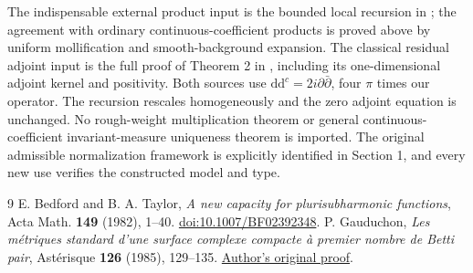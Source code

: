 \documentclass[11pt]{article}
\newcommand{\ddc}{\mathrm{d}\mathrm{d}^c}
\begin{document}
The indispensable external product input is the bounded local recursion in
\cite{BT}; the agreement with ordinary continuous-coefficient products is
proved above by uniform mollification and smooth-background expansion.
The classical residual adjoint input is the full proof of Theorem 2 in
\cite{Gau}, including its one-dimensional adjoint kernel and positivity.
Both sources use $\ddc=2i\partial\bar\partial$, four $\pi$ times our
operator. The recursion rescales homogeneously and the zero adjoint equation
is unchanged. No rough-weight multiplication theorem or general
continuous-coefficient invariant-measure uniqueness theorem is imported.
The original admissible normalization framework is explicitly identified
in Section 1, and every new use verifies the constructed model and type.

\begin{thebibliography}{9}
 E. Bedford and B. A. Taylor,
\emph{A new capacity for plurisubharmonic functions},
Acta Math. \textbf{149} (1982), 1--40.
\href{https://doi.org/10.1007/BF02392348}{doi:10.1007/BF02392348}.
 P. Gauduchon,
\emph{Les m\'etriques standard d'une surface complexe compacte \`a premier
nombre de Betti pair}, Ast\'erisque \textbf{126} (1985), 129--135.
\href{https://www.numdam.org/article/AST_1985__126__129_0.pdf}{Author's original proof}.
\end{thebibliography}
\end{document}
